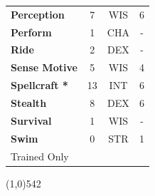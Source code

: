 \documentclass[letterpaper]{article}
\newcommand{\fullline}{\noindent\line(1,0){542} \\}
\begin{document}
\begin{table}[h!]
{{\begin{tabular}{l  c  c  c}
        \textbf{Perception} & 7 & {\footnotesize WIS} & 6 \\
        \textbf{Perform} & 1 & {\footnotesize CHA} & - \\
        \hline
        \textbf{Ride} & 2 & {\footnotesize DEX} & - \\
        \textbf{Sense Motive} & 5 & {\footnotesize WIS} & 4 \\
        \hline
        \textbf{Spellcraft *} & 13 & {\footnotesize INT} & 6 \\
        \textbf{Stealth} & 8 & {\footnotesize DEX} & 6 \\
        \hline
        \textbf{Survival} & 1 & {\footnotesize WIS} & - \\
        \textbf{Swim} & 0 & {\footnotesize STR} & 1 \\
        {\footnotesize * Trained Only} \\
        \end{tabular}
    }
}
\vspace{-1.5em}
\end{table} \par

\vspace{-1.5em}
\fullline
\vspace{-1em}
\end{document}
